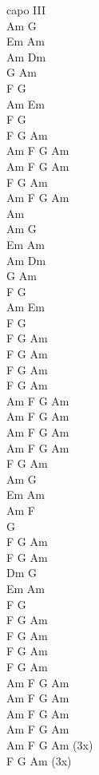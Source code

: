 \begin{chord}
\vin capo III\\
Am G\\
Em Am\\
Am Dm\\
G Am\\

F G\\
Am Em\\
F G\\
F G Am\\

Am F G Am\\
Am F G Am\\
F G Am\\
Am F G Am\\

Am\\
Am G\\
Em Am\\
Am Dm\\
G Am\\

F G\\
Am  Em\\
F G\\
F G Am\\
F G Am\\
F G Am\\
F G Am\\

Am F G Am\\
Am F G Am\\
Am F G Am\\
Am F G Am\\
F G Am\\

Am G\\
Em Am\\
Am F\\
G\\
F G Am\\
F G Am\\

Dm G\\
Em Am\\
F G\\
F G Am\\
F G Am\\
F G Am\\
F G Am\\

Am F G Am\\
Am F G Am\\
Am F G Am\\
Am F G Am\\
Am F G Am (3x)\\
F G Am (3x)\\
\end{chord}
